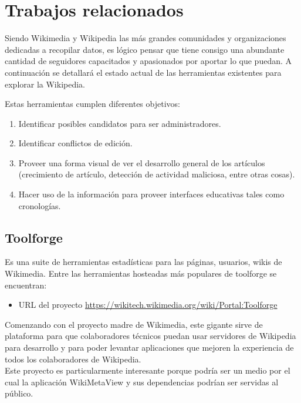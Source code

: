 \section{Trabajos relacionados}

Siendo Wikimedia y Wikipedia las más grandes comunidades y organizaciones dedicadas a recopilar datos, es lógico pensar que tiene consigo una abundante cantidad de seguidores capacitados y apasionados por aportar lo que puedan. A continuación se detallará el estado actual de las herramientas existentes para explorar la Wikipedia.

Estas herramientas cumplen diferentes objetivos:

\begin{enumerate}
    \item Identificar posibles candidatos para ser administradores.
    \item Identificar conflictos de edición.
    \item Proveer una forma visual de ver el desarrollo general de los artículos (crecimiento de artículo, detección de actividad maliciosa, entre otras cosas).
    \item Hacer uso de la información para proveer interfaces educativas tales como cronologías.
\end{enumerate}


\subsection{Toolforge}

Es una suite de herramientas estadísticas para las páginas, usuarios, wikis de Wikimedia. Entre las herramientas hosteadas más populares de toolforge se encuentran:

\begin{itemize}
    \item URL del proyecto \url{https://wikitech.wikimedia.org/wiki/Portal:Toolforge}
\end{itemize}

Comenzando con el proyecto madre de Wikimedia, este gigante sirve de plataforma para que colaboradores técnicos puedan usar servidores de Wikipedia para desarrollo y para poder levantar aplicaciones que mejoren la experiencia de todos los colaboradores de Wikipedia.
\\
Este proyecto es particularmente interesante porque podría ser un medio por el cual la aplicación WikiMetaView y sus dependencias podrían ser servidas al público.

